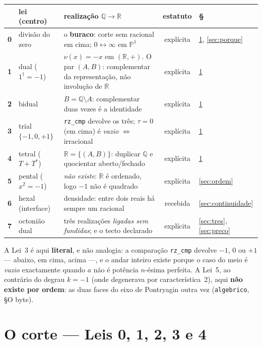 \documentclass[11pt,a4paper]{article}
\newcommand{\code}[1]{\texttt{\small #1}}
\newcommand{\dg}{^{\dagger}}
\newcommand{\Q}{\mathbb{Q}}
\newcommand{\R}{\mathbb{R}}
\begin{document}
\begin{center}\small
\begin{tabular}{@{}clp{5.2cm}cl@{}}
\toprule
 & lei (centro) & realização $\Q\!\to\!\R$ & estatuto & § \\
\midrule
\textbf{0} & divisão do zero & o \textbf{buraco}: corte sem racional em cima; $0\leftrightarrow\infty$ em $\mathbb{P}^1$ & explícita & \ref{sec:corte}, \ref{sec:porque} \\
\textbf{1} & dual ($1\dg=-1$) & $\nu(x)=-x$ em $(\R,+)$. O par $(A,B)$: complementar da representação, não involução de $\R$ & explícita & \ref{sec:corte} \\
\textbf{2} & bidual & $B=\Q\setminus A$: complementar duas vezes é a identidade & explícita & \ref{sec:corte} \\
\textbf{3} & trial $\{-1,0,+1\}$ & \code{rz\_cmp} devolve os três; $\tau=0$ (em cima) é \emph{vazio} $\iff$ irracional & explícita & \ref{sec:corte} \\
\textbf{4} & tetral ($T+T^{*}$) & $\R=\{(A,B)\}$: duplicar $\Q$ e quocientar aberto/fechado & explícita & \ref{sec:corte} \\
\textbf{5} & pental ($x^{2}=-1$) & \emph{não existe}: $\R$ é ordenado, logo $-1$ não é quadrado & explícita & \ref{sec:ordem} \\
\textbf{6} & hexal (interface) & densidade: entre dois reais há sempre um racional & recebida & \ref{sec:continuidade} \\
\textbf{7} & octonião dual & três realizações \emph{ligadas sem fundidas}; e o tecto declarado & explícita & \ref{sec:tres}, \ref{sec:preco} \\
\bottomrule
\end{tabular}
\end{center}

\noindent A Lei~3 é aqui \textbf{literal}, e não analogia: a comparação
\code{rz\_cmp} devolve $-1$, $0$ ou $+1$ --- abaixo, em cima, acima ---, e o
andar inteiro existe porque o caso do meio é \emph{vazio} exactamente quando
$a$ não é potência $n$-ésima perfeita. A Lei~5, ao contrário do degrau $k=-1$
(onde degenerava por característica~2), aqui \textbf{não existe por ordem}: as
duas faces do eixo de Pontryagin outra vez (\code{algebrico}, §O byte).

\section{O corte --- Leis 0, 1, 2, 3 e 4}\label{sec:corte}
\end{document}
